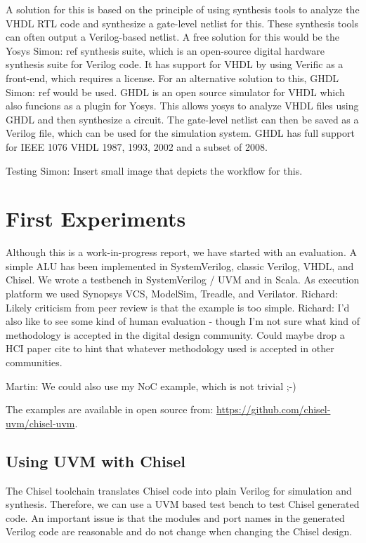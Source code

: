 \documentclass[a4paper, conference]{IEEEtran}
\newcommand{\martin}[1]{{\color{blue} Martin: #1}}
\newcommand{\simon}[1]{{\color{green} Simon: #1}}
\newcommand{\ducky}[1]{{\color{orange} Richard: #1}}
\begin{document}
A solution for this is based on the principle of using synthesis tools to analyze the VHDL RTL code and synthesize a gate-level netlist for this. These synthesis tools can often output a Verilog-based netlist. A free solution for this would be the Yosys \simon{ref} synthesis suite, which is an open-source digital hardware synthesis suite for Verilog code. It has support for VHDL by using Verific as a front-end, which requires a license. For an alternative solution to this, GHDL \simon{ref} would be used. GHDL is an open source simulator for VHDL which also funcions as a plugin for Yosys. This allows yosys to analyze VHDL files using GHDL and then synthesize a circuit. The gate-level netlist can then be saved as a Verilog file, which can be used for the simulation system. GHDL has full support for IEEE 1076 VHDL 1987, 1993, 2002 and a subset of 2008.

Testing
\simon{Insert small image that depicts the workflow for this.}

\section{First Experiments}

Although this is a work-in-progress report, we have started with an evaluation.
A simple ALU has been implemented in SystemVerilog, classic Verilog, VHDL, and Chisel.
We wrote a testbench in SystemVerilog / UVM and in Scala. As execution platform we used Synopsys VCS, ModelSim, Treadle, and Verilator.
\ducky{Likely criticism from peer review is that the example is too simple.}
\ducky{I'd also like to see some kind of human evaluation - though I'm not sure what kind of methodology is accepted in the digital design community. Could maybe drop a HCI paper cite to hint that whatever methodology used is accepted in other communities.}

\martin{We could also use my NoC example, which is not trivial ;-)}

The examples are available in open source from: \url{https://github.com/chisel-uvm/chisel-uvm}.

\subsection{Using UVM with Chisel}

The Chisel toolchain translates Chisel code into plain Verilog for simulation and synthesis. Therefore, we can use a UVM based test bench to test Chisel generated code.
An important issue is that the modules and port names in the generated Verilog code are reasonable and do not change when changing the Chisel design.
\end{document}
